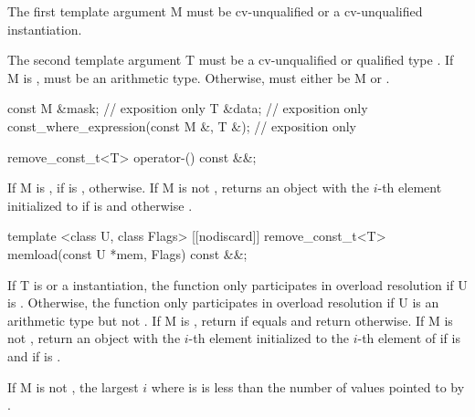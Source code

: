 \pnum The first template argument \type M must be cv-unqualified \bool or a cv-unqualified \mask instantiation.

\pnum The second template argument \type T must be a cv-unqualified or \const qualified type .
If \type M is \bool,  must be an arithmetic type.
Otherwise,  must either be \type M or .

\begin{itemdecl}
const M &mask;                           // exposition only
T &data;                                 // exposition only
const_where_expression(const M &, T &);  // exposition only
\end{itemdecl}
\begin{itemdescr}
  \pnum{}

  \pnum{}
\end{itemdescr}

\begin{itemdecl}
remove_const_t<T> operator-() const &&;
\end{itemdecl}
\begin{itemdescr}
  \pnum\returns If \type M is \bool,  if  is \true,  otherwise.
  If \type M is not \bool, returns an object with the $i$-th element initialized to  if  is \true and  otherwise \foralli[M::].
\end{itemdescr}

\begin{itemdecl}
template <class U, class Flags>
[[nodiscard]] remove_const_t<T> memload(const U *mem, Flags) const &&;
\end{itemdecl}
\begin{itemdescr}
  \pnum\remarks If \type T is \bool or a \mask instantiation, the function only participates in overload resolution if \type U is \bool.
  Otherwise, the function only participates in overload resolution if \type U is an arithmetic type but not \bool.
  \pnum\returns If \type M is \bool, return  if  equals \true and return  otherwise.
  If \type M is not \bool, return an object with the $i$-th element initialized to the $i$-th element of  if  is \false and  if  is \true \foralli[M::].

  \pnum\requires If \type M is not \bool, the largest $i$ where  is \true is less than the number of values pointed to by .
\end{itemdescr}

